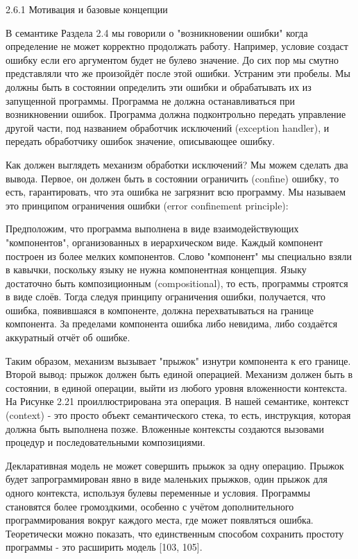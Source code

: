 2.6.1 Мотивация и базовые концепции

В семантике Раздела 2.4 мы говорили о "возникновении ошибки" когда определение не может корректно продолжать работу. Например, условие создаст ошибку если его аргументом будет не булево значение. До сих пор мы смутно представляли что же произойдёт после этой ошибки. Устраним эти пробелы. Мы должны быть в состоянии определить эти ошибки и обрабатывать их из запущенной программы. Программа не должна останавливаться при возникновении ошибок. Программа должна подконтрольно передать управление другой части, под названием обработчик исключений (exception handler), и передать обработчику ошибок значение, описывающее ошибку.

Как должен выглядеть механизм обработки исключений? Мы можем сделать два вывода. Первое, он должен быть в состоянии ограничить (confine) ошибку, то есть, гарантировать, что эта ошибка не загрязнит всю программу. Мы называем это принципом ограничения ошибки (error confinement principle):

Предположим, что программа выполнена в виде взаимодействующих "компонентов", организованных в иерархическом виде. Каждый компонент построен из более мелких компонентов. Слово "компонент" мы специально взяли в кавычки, поскольку языку не нужна компонентная концепция. Языку достаточно быть композиционным (compositional), то есть, программы строятся в виде слоёв. Тогда следуя принципу ограничения ошибки, получается, что ошибка, появившаяся в компоненте, должна перехватываться на границе компонента. За пределами компонента ошибка либо невидима, либо создаётся аккуратный отчёт об ошибке.

Таким образом, механизм вызывает "прыжок" изнутри компонента к его границе. Второй вывод: прыжок должен быть единой операцией. Механизм должен быть в состоянии, в единой операции, выйти из любого уровня вложенности контекста. На Рисунке 2.21 проиллюстрирована эта операция. В нашей семантике, контекст (context) - это просто объект семантического стека, то есть, инструкция, которая должна быть выполнена позже. Вложенные контексты создаются вызовами процедур и последовательными композициями.

Декларативная модель не может совершить прыжок за одну операцию. Прыжок будет запрограммирован явно в виде маленьких прыжков, один прыжок для одного контекста, используя булевы переменные и условия. Программы становятся более громоздкими, особенно с учётом дополнительного программирования вокруг каждого места, где может появляться ошибка. Теоретически можно показать, что единственным способом сохранить простоту программы - это расширить модель [103, 105].

